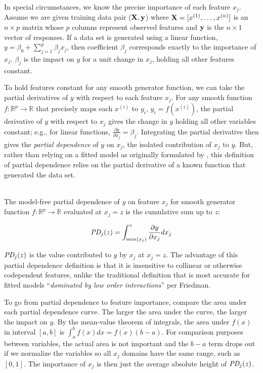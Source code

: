 \documentclass[12pt]{article}
\newcommand{\todo}[1]{{{\color{red}{[#1]}}}}
\renewcommand{\xi}{x^{(i)}}
\begin{document}
In special circumstances, we know the precise importance of each feature $x_j$. Assume we are given training data pair ($\bf X, y$) where ${\bf X} = [x^{(1)}, \ldots, x^{(n)}]$ is an $n \times p$ matrix whose $p$ columns represent observed features and ${\bf y}$ is the $n \times 1$ vector of responses.  If a data set is generated using a linear function, $y = \beta_0 + \sum_{j=1}^p \beta_j x_j$, \todo{assumes independence of $x_j$?} then coefficient $\beta_j$ corresponds exactly to the importance of $x_j$.  $\beta_j$ is the impact on $y$ for a unit change in $x_j$, holding all other features constant.

To hold features constant for any smooth generator function, we can take the partial derivatives of $y$ with respect to each feature $x_j$. For any smooth function $f:\mathbb{R}^{p} \rightarrow \mathbb{R}$ that precisely maps each $\xi$ to $y_i$, ${y_i} = f(\xi)$, \todo{should that be $y^{(i)}$ to be consistent?} the partial derivative of $y$ with respect to $x_j$ gives the change in $y$ holding all other variables constant; e.g., for linear functions, $\frac{\partial y}{\partial x_j}=\beta_j$. Integrating the partial derivative then gives the {\em partial dependence}  of $y$ on $x_j$, the isolated contribution of $x_j$ to $y$. But, rather than relying on a fitted model as originally formulated by \cite{PDP}, this definition of partial dependence relies on the partial derivative of a known function that generated the data set.

~\\
 The model-free partial dependence of $y$ on feature $x_j$ for smooth generator function $f:\mathbb{R}^{p} \rightarrow \mathbb{R}$ evaluated at $x_j = z$ is the cumulative sum up to $z$:

\begin{equation}\label{eq:pd}
\text{\it PD}_j(z) = \int_{min(x_j)}^z \frac{\partial y}{\partial x_j} dx_j
\end{equation}

$\text{\it PD}_j(z)$ is the value contributed to $y$ by $x_j$ at $x_j = z$. The advantage of this partial dependence definition is that it is insensitive to collinear or otherwise codependent features, unlike the traditional definition that is most accurate for fitted models ``{\em dominated by low order interactions}'' per Friedman.  

To go from partial dependence to feature importance, compare the area under each partial dependence curve. The larger the area under the curve, the larger the impact on $y$.   By the mean-value theorem of integrals, the area under $f(x)$ in interval $[a,b]$ is $\int_{a}^{b} f(x) dx = \overline{f(x)}(b-a)$.  For comparison purposes between variables, the actual area is not important and the $b-a$ term drops out if we normalize the variables so all $x_j$ domains have the same range, such as $[0,1]$. The importance of $x_j$ is then just the average absolute height of $\text{\it PD}_j(z)$.
\end{document}
